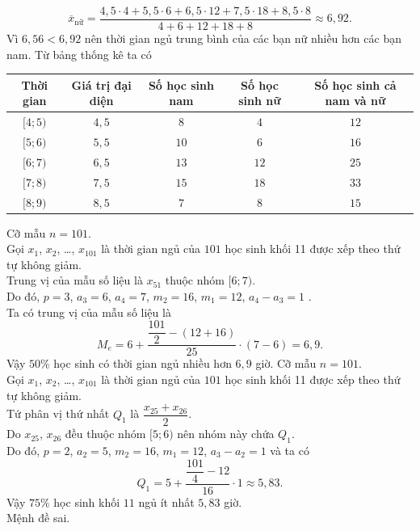 \begin{ex}
{\begin{itemchoice}
			$$\overline{x}_{\text {nữ} }=\dfrac{4{,}5\cdot 4+5{,}5\cdot 6+6{,}5\cdot 12+7{,}5\cdot 18+8{,}5\cdot 8}{4+6+12+18+8}\approx 6{,}92.$$
			Vì $6{,}56<6{,}92$ nên thời gian ngủ trung bình của các bạn nữ nhiều hơn các bạn nam.
			\itemch 
			Từ bảng thống kê ta có
			\begin{center}
				\renewcommand{\arraystretch}{1.5}
				\begin{tabular}{|c|c|c|c|c|}
					\hline
					Thời gian & Giá trị đại diện & Số học sinh nam & Số học sinh nữ & Số học sinh cả nam và nữ \\
					\hline
					$[4;5)$ & $4{,}5$ & $8$ & $4$ & $12$\\
					\hline
					$[5;6)$ & $5{,}5$ & $10$ & $6$ & $16$\\
					\hline
					$[6;7)$ & $6{,}5$ & $13$ & $12$ & $25$\\
					\hline
					$[7;8)$ & $7{,}5$ & $15$ & $18$ & $33$\\
					\hline
					$[8;9)$ & $8{,}5$ & $7$ & $8$ & $15$\\
					\hline
				\end{tabular}
			\end{center}
			Cỡ mẫu $n=101$.\\
			Gọi $x_1$, $x_2$, \ldots, $x_{101}$ là thời gian ngủ của $101$ học sinh khối 11 được xếp theo thứ tự không giảm.\\
			Trung vị của mẫu số liệu là $x_{51}$ thuộc nhóm $[6;7)$.\\
			Do đó, $p=3$, $ a_{3}=6$, $ a_{4}=7$, $ m_{2}=16$, $m_{1}=12$, $ a_{4}-a_{3}=1$ .\\
			Ta có trung vị của mẫu số liệu là
			$$
			M_{e}=6+\dfrac{\dfrac{101}{2}-(12+16)}{25}\cdot(7-6)=6{,}9.
			$$
			Vậy $50$\% học sinh có thời gian ngủ nhiều hơn $6{,}9$ giờ.
			\itemch 
			Cỡ mẫu $n=101$.\\
			Gọi $x_1$, $x_2$, \ldots, $x_{101}$ là thời gian ngủ của $101$ học sinh khối 11 được xếp theo thứ tự không giảm.\\
			Tứ phân vị thứ nhất $Q_{1}$ là $\dfrac{x_{25}+x_{26}}{2}$.\\
			Do $x_{25}$, $x_{26}$ đều thuộc nhóm $[5;6)$ nên nhóm này chứa $Q_{1}$.\\
			Do đó, $p=2$, $ a_{2}=5$, $ m_{2}=16$, $ m_{1}=12$, $ a_{3}-a_{2}=1$ và ta có\\
			$$Q_{1}=5+\dfrac{\dfrac{101}{4}-12}{16}\cdot 1\approx 5{,}83.$$
			Vậy $75\%$ học sinh khối $11$ ngủ ít nhất $5{,}83$ giờ.\\
			Mệnh đề sai.
		\end{itemchoice}
	}
\end{ex}

